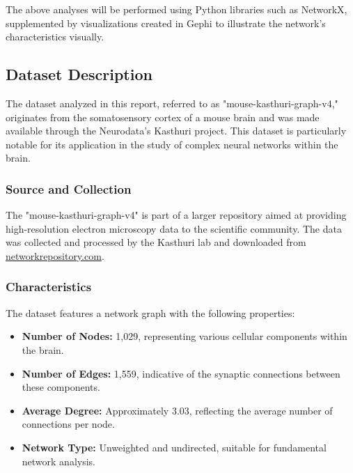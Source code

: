 \documentclass[
	report, %
	11pt, %
]{CSUniSchoolLabReport}
\begin{document}
		\vspace{10pt}

		The above analyses will be performed using Python libraries such as NetworkX, supplemented by visualizations created in Gephi to illustrate the network's characteristics visually.

		\subsection{Dataset Description}

		The dataset analyzed in this report, referred to as "mouse-kasthuri-graph-v4," originates from the somatosensory cortex of a mouse brain and was made available through the Neurodata's Kasthuri project. This dataset is particularly notable for its application in the study of complex neural networks within the brain.
		
		\subsubsection{Source and Collection}
		
		The "mouse-kasthuri-graph-v4" is part of a larger repository aimed at providing high-resolution electron microscopy data to the scientific community. The data was collected and processed by the Kasthuri lab and downloaded from \href{http://networkrepository.com/mouse-kasthuri-graph-v4.php}{networkrepository.com}.
		
		\subsubsection{Characteristics}
		
		The dataset features a network graph with the following properties:
		\begin{itemize}
			\item \textbf{Number of Nodes:} 1,029, representing various cellular components within the brain.
			\item \textbf{Number of Edges:} 1,559, indicative of the synaptic connections between these components.
			\item \textbf{Average Degree:} Approximately 3.03, reflecting the average number of connections per node.
			\item \textbf{Network Type:} Unweighted and undirected, suitable for fundamental network analysis.
		\end{itemize}
		\vspace{10pt}
		
\end{document}
